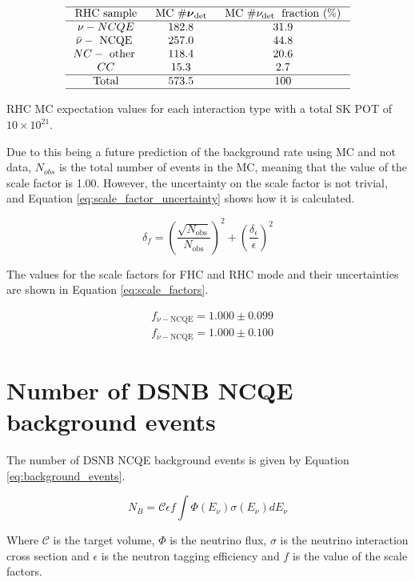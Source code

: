 \begin{table}
    $$
    \begin{array}{ccc}
    \hline \text { RHC sample } & \text { MC } \# \boldsymbol{\nu}_{\text {det }} & \text { MC } \# \nu_{\text {det }} \text { fraction (\%) } \\
    \hline \nu-N C Q E & 182.8 & 31.9 \\
    \bar{\nu}-\text { NCQE } & 257.0 & 44.8 \\
    N C-\text { other } & 118.4 & 20.6 \\
    C C & 15.3 & 2.7 \\
    \hline \text { Total } & 573.5 & 100 \\
    \hline
    \end{array}
    $$
    \caption{RHC MC expectation values for each interaction type with a total SK POT of $10 \times 10^{21}$.}
    \label{table:nu_RHC_mc}
\end{table}

Due to this being a future prediction of the background rate using MC and not data, $N_{obs}$ is the total number of events in the MC, meaning that the value of the scale factor is 1.00. However, the uncertainty on the scale factor is not trivial, and Equation \ref{eq:scale_factor_uncertainty} shows how it is calculated.

\begin{equation}
    \delta_{f} = \left({\frac{\sqrt{N_{\text{obs}}}}{N_{\text{obs}}}}\right)^{2} + \left({\frac{\delta_{\epsilon}}{\epsilon}}\right)^{2}
\label{eq:scale_factor_uncertainty}
\end{equation}

The values for the scale factors for FHC and RHC mode and their uncertainties are shown in Equation \ref{eq:scale_factors}.


\begin{equation}
    \begin{aligned}
    & f_{\nu-\mathrm{NCQE}}= 1.000 \pm 0.099 \\
    & f_{\bar{\nu}-\mathrm{NCQE}}=1.000 \pm 0.100
    \label{eq:scale_factors}
    \end{aligned}
\end{equation}


\section{Number of DSNB NCQE background events}

The number of DSNB NCQE background events is given by Equation \ref{eq:background_events}. 

\begin{equation}
N_{B} = \mathcal{C} \epsilon f\int \Phi(E_{\nu}) \sigma(E_{\nu}) d E_{\nu} 
\label{eq:background_events}
\end{equation}

Where $\mathcal{C}$ is the target volume, $\Phi$ is the neutrino flux, $\sigma$ is the neutrino interaction cross section and $\epsilon$ is the neutron tagging efficiency and $f$ is the value of the scale factors.




